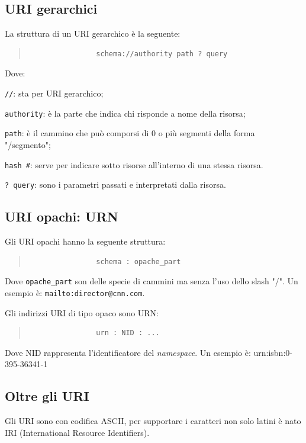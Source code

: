 		\subsection{URI gerarchici}
			La struttura di un URI gerarchico è la seguente:
			\begin{quote}
			\begin{verbatim}
				schema://authority path ? query
			\end{verbatim}
			\end{quote}
			Dove:
			\begin{description}
				\item \verb|//|: sta per URI gerarchico;
				\item \verb|authority|: è la parte che indica chi risponde a nome della risorsa;
				\item \verb|path|: è il cammino che può comporsi di 0 o più segmenti della forma "/segmento";
				\item \verb|hash #|: serve per indicare sotto risorse all'interno di una stessa risorsa.
				\item \verb|? query|: sono i parametri passati e interpretati dalla risorsa.
			\end{description}
		
		\subsection{URI opachi: URN}
			Gli URI opachi hanno la seguente struttura:
			\begin{quote}
			\begin{verbatim}
				schema : opache_part
			\end{verbatim}
			\end{quote}
			
			Dove \verb|opache_part| son delle specie di cammini ma senza l'uso dello slash "/". Un esempio è: \verb|mailto:director@cnn.com|.
			
			Gli indirizzi URI di tipo opaco sono URN:
			\begin{quote}
			\begin{verbatim}
				urn : NID : ...
			\end{verbatim}
			\end{quote}
			Dove NID rappresenta l'identificatore del \emph{namespace}.
			Un esempio è: urn:isbn:0-395-36341-1
		
		\subsection{Oltre gli URI}
			Gli URI sono con codifica ASCII, per supportare i caratteri non solo latini è nato IRI (International Resource Identifiers).
		
